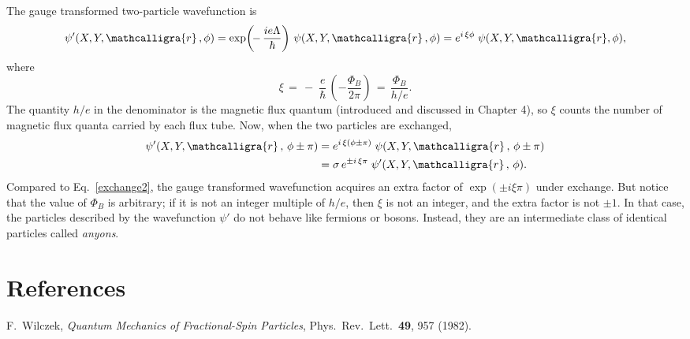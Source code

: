 \documentclass[pra,12pt]{revtex4}
\begin{document}
The gauge transformed two-particle wavefunction is
\begin{equation}
  \psi'(X, Y, \mathcalligra{r}\,, \phi)
  = \exp\!\left(\!-\,\frac{ie\Lambda}{\hbar}\right)\,
  \psi(X, Y, \mathcalligra{r}\,, \phi)
  = e^{i \, \xi \phi}\; \psi(X, Y, \mathcalligra{r}, \phi),
\end{equation}
where
\begin{equation}
  \xi \,=\, -\;\frac{e}{\hbar}\,\left(-\frac{\Phi_B}{2\pi}\right)
  \,=\, \frac{\Phi_B}{h/e}.
\end{equation}
The quantity $h/e$ in the denominator is the magnetic flux quantum
(introduced and discussed in Chapter 4), so $\xi$ counts the number of
magnetic flux quanta carried by each flux tube.  Now, when the two
particles are exchanged,
\begin{align}
  \psi'(X, Y, \mathcalligra{r}\,,\, \phi \pm \pi) &=
  e^{i \, \xi (\phi\pm \pi)} \;
  \psi(X, Y, \mathcalligra{r}\,,\, \phi \pm \pi) \\
  &= \sigma \,e^{\pm i \, \xi\pi}\;
  \psi'(X, Y, \mathcalligra{r}\,,\, \phi).
\end{align}
Compared to Eq.~\eqref{exchange2}, the gauge transformed wavefunction
acquires an extra factor of $\exp(\pm i \xi \pi)$ under exchange.  But
notice that the value of $\Phi_B$ is arbitrary; if it is not an
integer multiple of $h/e$, then $\xi$ is not an integer, and the extra
factor is not $\pm 1$.  In that case, the particles described by the
wavefunction $\psi'$ do not behave like fermions or bosons.  Instead,
they are an intermediate class of identical particles called
\textit{anyons}.

\section*{References}

\begin{enumerate}[[1{]}]
\item F.~Wilczek, \textit{Quantum Mechanics of Fractional-Spin Particles},
  Phys.~Rev.~Lett.~\textbf{49}, 957 (1982).
  \label{cite:wilczek}
\end{enumerate}
\end{document}

